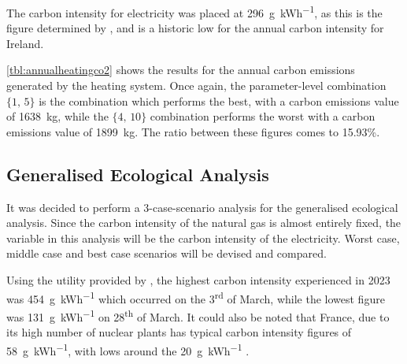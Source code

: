 The carbon intensity for electricity was placed at \qty{296}{\gram\per\kWh}, as this is the figure determined by \citeauthor{seai_energy_2021} \cite{seai_energy_2021}, and is a historic low for the annual carbon intensity for Ireland. 

\cref{tbl:annualheatingco2} shows the results for the annual carbon emissions generated by the heating system. Once again, the parameter-level combination $\{1\text{, }5\}$ is the combination which performs the best, with a carbon emissions value of \qty{1638}{\kilo\gram}, while the $\{4\text{, }10\}$ combination performs the worst with a carbon emissions value of \qty{1899}{\kilo\gram}. The ratio between these figures comes to 15.93\%. 

\begin{table}[htb]
    \footnotesize
    \centering
    \caption{Irish Case Study: Total annual $\text{CO}_2$ emissions from \acs{HHS} [kg]}
    \label{tbl:annualheatingco2}
\end{table}


\subsection{Generalised Ecological Analysis}
It was decided to perform a 3-case-scenario analysis for the generalised ecological analysis. Since the carbon intensity of the natural gas is almost entirely fixed, the variable in this analysis will be the carbon intensity of the electricity. Worst case, middle case and best case scenarios will be devised and compared. 

Using the  \cite{eirgrid_group_explore_2023} utility provided by \citeauthor{eirgrid_group_explore_2023}, the highest carbon intensity experienced in 2023 was \qty{454}{\gram\per\kWh} which occurred on the 3\textsuperscript{rd} of March, while the lowest figure was \qty{131}{\gram\per\kWh} on 28\textsuperscript{th} of March. It could also be noted that France, due to its high number of nuclear plants has typical carbon intensity figures of \qty{58}{\gram\per\kWh}, with lows around the \qty{20}{\gram\per\kWh} \cite{iea2019world}.


